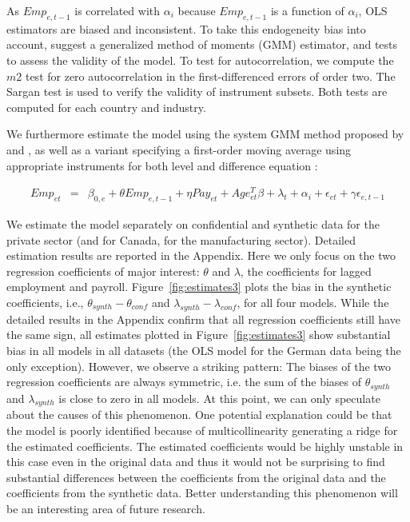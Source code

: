 As $Emp_{e,t-1}$ is correlated with $\alpha_{i}$ because $Emp_{e,t-1}$ is a function of $\alpha_{i}$, 
OLS estimators are biased and inconsistent. 
To take this endogeneity bias into account,  \textcite{RePEc:oup:restud:v:58:y:1991:i:2:p:277-297.} suggest a generalized method of moments (GMM) estimator, and tests to assess the  validity of the model.  To test for autocorrelation, we compute the  $m2$ test  for zero autocorrelation in the  first-differenced errors of order two. The Sargan test is used to verify the validity of instrument subsets. Both tests are computed for each country and industry.

We furthermore estimate the model using the system GMM  method proposed by \textcite{RePEc:eee:econom:v:68:y:1995:i:1:p:29-51} and \textcite{RePEc:eee:econom:v:87:y:1998:i:1:p:115-143}, as well as a variant specifying a first-order moving average using appropriate instruments for both level and difference equation  \parencite{RePEc:eee:econom:v:68:y:1995:i:1:p:29-51,RePEc:eee:econom:v:87:y:1998:i:1:p:115-143}:

\begin{eqnarray}	
Emp_{et}&=&\beta_{0,e} +\theta Emp_{e,t-1}+\eta Pay_{et}+Age_{et}^{T}\beta+\lambda_t+\alpha_i+\epsilon_{et}+\gamma\epsilon_{e,t-1}
\end{eqnarray}


We estimate the model separately on confidential and synthetic data for the private sector (and for Canada, for the manufacturing sector). Detailed estimation results are reported in the Appendix. Here we only focus on the two regression coefficients of major interest: $\theta$ and $\lambda$, the coefficients for lagged employment and payroll. Figure~\ref{fig:estimates3} plots the bias in the synthetic coefficients, i.e., $\theta_{synth}-\theta_{conf}$ and $\lambda_{synth}-\lambda_{conf}$, for all four models. While the detailed results in the Appendix confirm that all regression coefficients still have the same sign, all estimates plotted in Figure~\ref{fig:estimates3} show substantial bias in all models in all datasets (the OLS model for the German data being the only exception). However, we observe a striking pattern: The biases of the two regression coefficients are always symmetric, i.e. the sum of the biases of $\theta_{synth}$ and $\lambda_{synth}$ is close to zero in all models. At this point, we can only speculate about the causes of this phenomenon. One potential explanation could be that the model is poorly identified because of multicollinearity generating a ridge for the estimated coefficients. The estimated coefficients would be highly unstable in this case even in the original data and thus it would not be surprising to find substantial differences between the coefficients from the original data and the coefficients from the synthetic data. Better understanding this phenomenon will be an interesting area of future research.

